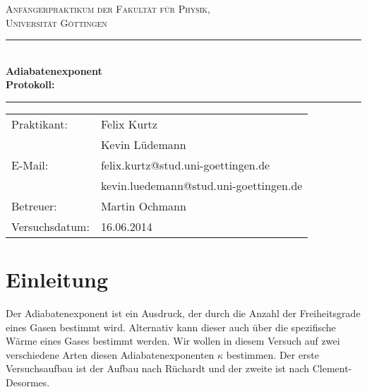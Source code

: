 \documentclass[12pt,a4paper,titlepage,headinclude,bibtotoc]{scrartcl}
\begin{document}
\begin{titlepage}
\centering
\textsc{\Large Anfängerpraktikum der Fakultät für
  Physik,\\[1.5ex] Universität Göttingen}

\vspace*{4.2cm}

\rule{\textwidth}{1pt}\\[0.5cm]
{\huge \bfseries
  Adiabatenexponent\\[1.5ex]
  Protokoll:}\\[0.5cm]
\rule{\textwidth}{1pt}

\vspace*{3.0cm}

\begin{Large}
\begin{tabular}{ll}
Praktikant:
 	&  Felix Kurtz\\
	&  Kevin Lüdemann\\

  E-Mail: 
	&  felix.kurtz@stud.uni-goettingen.de\\
	&  kevin.luedemann@stud.uni-goettingen.de\\

 Betreuer: & Martin Ochmann\\
 Versuchsdatum: & 16.06.2014\\
\end{tabular}
\end{Large}

\vspace*{0.8cm}

\begin{Large}
\end{Large}

\end{titlepage}

\tableofcontents

\newpage

\section{Einleitung}
\label{sec:einleitung}
Der Adiabatenexponent ist ein Ausdruck, der durch die Anzahl der Freiheitsgrade eines Gasen bestimmt wird. 
Alternativ kann dieser auch über die spezifische Wärme eines Gases bestimmt werden.
Wir wollen in diesem Versuch auf zwei verschiedene Arten diesen Adiabatenexponenten $\kappa$ bestimmen.
Der erste Versuchsaufbau ist der Aufbau nach Rüchardt und der zweite ist nach Clement-Desormes.
\end{document}
